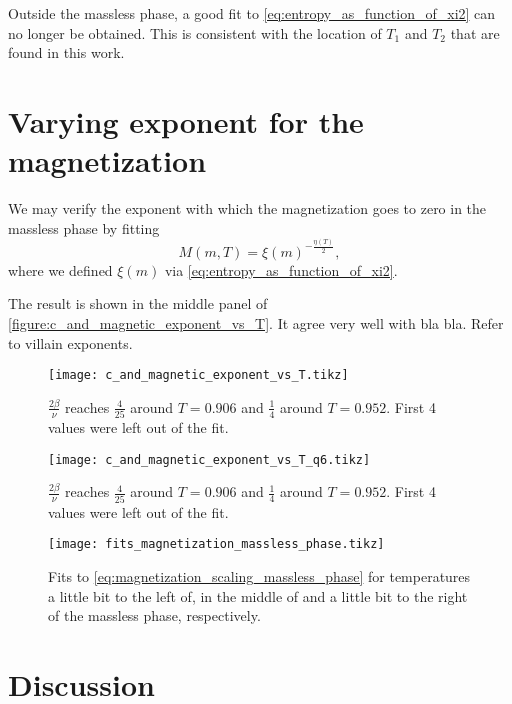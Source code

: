 Outside the massless phase, a good fit to \autoref{eq:entropy_as_function_of_xi2} can no longer be obtained.
This is consistent with the location of $T_1$ and $T_2$ that are found in this work.


\section{Varying exponent for the magnetization}
We may verify the exponent with which the magnetization goes to zero in the massless phase by fitting
\begin{equation}\label{eq:magnetization_scaling_massless_phase}
  M(m, T) = \xi(m)^{-\frac{\eta(T)}{2}},
\end{equation}
where we defined $\xi(m)$ via \autoref{eq:entropy_as_function_of_xi2}.

The result is shown in the middle panel of \autoref{figure:c_and_magnetic_exponent_vs_T}.
It agree very well with bla bla.
Refer to villain exponents.


\begin{figure}
  \centering
  \texttt{[image: c\_and\_magnetic\_exponent\_vs\_T.tikz]}
  \caption{$\frac{2\beta}{\nu}$ reaches $\frac{4}{25}$ around $T = 0.906$ and $\frac{1}{4}$ around $T = 0.952$.
  First 4 values were left out of the fit.
}\label{figure:c_and_magnetic_exponent_vs_T}
\end{figure}

\begin{figure}
  \centering
  \texttt{[image: c\_and\_magnetic\_exponent\_vs\_T\_q6.tikz]}
  \caption{$\frac{2\beta}{\nu}$ reaches $\frac{4}{25}$ around $T = 0.906$ and $\frac{1}{4}$ around $T = 0.952$.
  First 4 values were left out of the fit.
}\label{figure:c_and_magnetic_exponent_vs_T_q6}
\end{figure}

\begin{figure}
  \centering
  \texttt{[image: fits\_magnetization\_massless\_phase.tikz]}
  \caption{Fits to \autoref{eq:magnetization_scaling_massless_phase} for temperatures a little bit to the left of,
  in the middle of and a little bit to the right of the massless phase,
  respectively.
}\label{figure:fits_magnetization_massless_phase}
\end{figure}

\section{Discussion}

